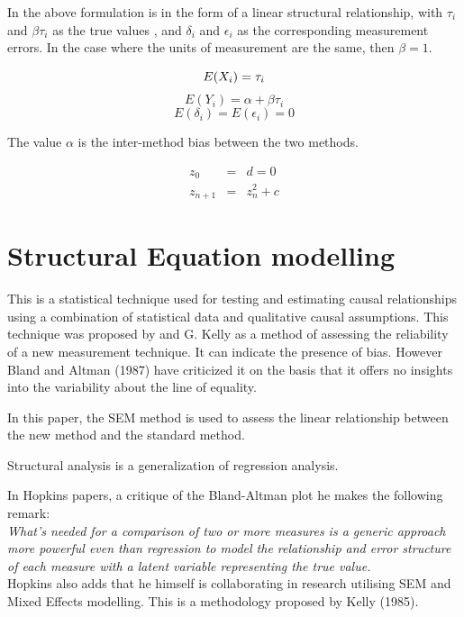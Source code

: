 \documentclass[12pt, a4paper]{report}
\theoremstyle{plain}
\theoremstyle{definition}
\theoremstyle{remark}
\begin{document}
In the above formulation is in the form of a linear structural
relationship, with $\tau_{i}$ and $\beta\tau_{i}$ as the true
values , and $\delta_{i}$ and $\epsilon_{i}$ as the corresponding
measurement errors. In the case where the units of measurement are
the same, then $\beta =1$.

\begin{equation}
E(X_{i}) = \tau_{i}\\
\end{equation}
\begin{equation}
E(Y_{i}) = \alpha +\beta\tau_{i} \nonumber
\end{equation}
\begin{equation}
E(\delta_{i}) = E(\epsilon_{i}) = 0 \nonumber
\end{equation}

The value $\alpha$ is the inter-method bias between the two
methods.


\begin{eqnarray}
z_0 &=& d = 0 \\
z_{n+1} &=& z_n^2+c
\end{eqnarray}


\section{Structural Equation modelling}
This is a statistical technique used for testing and estimating causal relationships using a combination of statistical data and qualitative causal assumptions. This technique was proposed by \citet{Lewis} and G. Kelly as a method of assessing the reliability of a new measurement technique. It can indicate the presence of bias. However Bland and Altman (1987) have criticized it on the basis that it offers no insights into the variability about the line of equality.

In this paper, the SEM method is used to assess the linear relationship between the new method and the standard method.

Structural analysis is a generalization of regression analysis.

In Hopkins papers, a critique of the Bland-Altman plot he makes the following remark:
\\
\emph{What's needed for a comparison of two or more measures is a
	generic approach more powerful even than regression to model the
	relationship and error structure of each measure with a latent
	variable representing the true value.}
\\
Hopkins also adds that he himself is collaborating in research utilising SEM and Mixed Effects modelling. This is a methodology proposed by Kelly (1985).
\end{document}
